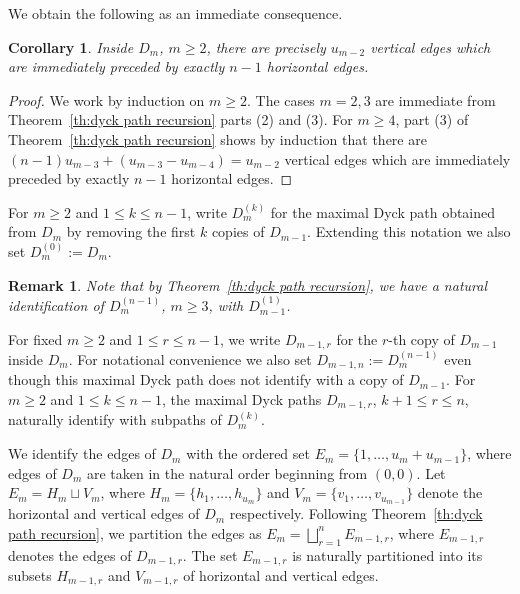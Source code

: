 \documentclass{amsart}
\newtheorem{corollary}[theorem]{Corollary}
\newtheorem{remark}[theorem]{Remark}
\numberwithin{equation}{section}
\begin{document}
We obtain the following as an immediate consequence.
\begin{corollary}
  \label{cor:short hooks}
  Inside $D_m$, $m\ge2$, there are precisely $u_{m-2}$ vertical edges which are immediately preceded by exactly $n-1$ horizontal edges.
\end{corollary}
\begin{proof}
  We work by induction on $m\ge2$.
  The cases $m=2,3$ are immediate from Theorem~\ref{th:dyck path recursion} parts (2) and (3).
  For $m\ge4$, part (3) of Theorem~\ref{th:dyck path recursion} shows by induction that there are $(n-1)u_{m-3}+(u_{m-3}-u_{m-4})=u_{m-2}$ vertical edges which are immediately preceded by exactly $n-1$ horizontal edges.
\end{proof}

For $m\ge2$ and $1\le k\le n-1$, write $D_m^{(k)}$ for the maximal Dyck path obtained from $D_m$ by removing the first $k$ copies of $D_{m-1}$.
Extending this notation we also set $D_m^{(0)}:=D_m$.
\begin{remark}
  Note that by Theorem~\ref{th:dyck path recursion}, we have a natural identification of $D_m^{(n-1)}$, $m\ge3$, with $D_{m-1}^{(1)}$.
\end{remark}
For fixed $m\ge2$ and $1\le r\le n-1$, we write $D_{m-1,r}$ for the $r$-th copy of $D_{m-1}$ inside $D_m$.
For notational convenience we also set $D_{m-1,n}:=D_m^{(n-1)}$ even though this maximal Dyck path does not identify with a copy of $D_{m-1}$.
For $m\ge2$ and $1\le k\le n-1$, the maximal Dyck paths $D_{m-1,r}$, $k+1\le r\le n$, naturally identify with subpaths of $D_m^{(k)}$.

We identify the edges of $D_m$ with the ordered set $E_m=\{1,\ldots,u_m+u_{m-1}\}$, where edges of $D_m$ are taken in the natural order beginning from $(0,0)$.
Let $E_m=H_m\sqcup V_m$, where $H_m=\{h_1,\ldots,h_{u_m}\}$ and $V_m=\{v_1,\ldots,v_{u_{m-1}}\}$ denote the horizontal and vertical edges of $D_m$ respectively.
Following Theorem~\ref{th:dyck path recursion}, we partition the edges as $E_m=\bigsqcup_{r=1}^n E_{m-1,r}$, where $E_{m-1,r}$ denotes the edges of $D_{m-1,r}$.
The set $E_{m-1,r}$ is naturally partitioned into its subsets $H_{m-1,r}$ and $V_{m-1,r}$ of horizontal and vertical edges.
\end{document}
